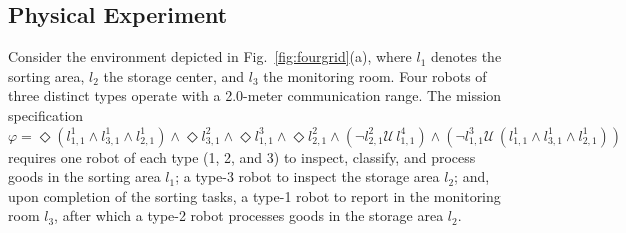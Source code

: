 \documentclass[lettersize,journal]{IEEEtran}
\begin{document}




\subsection{Physical Experiment}

Consider the environment depicted in Fig.~\ref{fig:fourgrid}(a), where $l_1$ denotes the sorting area, $l_2$ the storage center, and $l_3$ the monitoring room. Four robots of three distinct types operate with a 2.0-meter communication range. The mission specification $\varphi = \Diamond(l^{1}_{1,1} \land l^{1}_{3,1} \land l^{1}_{2,1}) \land \Diamond l^{2}_{3,1} \land \Diamond l^{3}_{1,1} \land \Diamond l^{2}_{2,1} \land (\neg l^{2}_{2,1} \mathcal{U} \, l^{4}_{1,1}) \land (\neg l^{3}_{1,1} \mathcal{U} \, (l^{1}_{1,1} \land l^{1}_{3,1} \land l^{1}_{2,1}))$ requires one robot of each type (1, 2, and 3) to inspect, classify, and process goods in the sorting area $l_1$; a type-3 robot to inspect the storage area $l_2$; and, upon completion of the sorting tasks, a type-1 robot to report in the monitoring room $l_3$, after which a type-2 robot processes goods in the storage area $l_2$.
\end{document}

